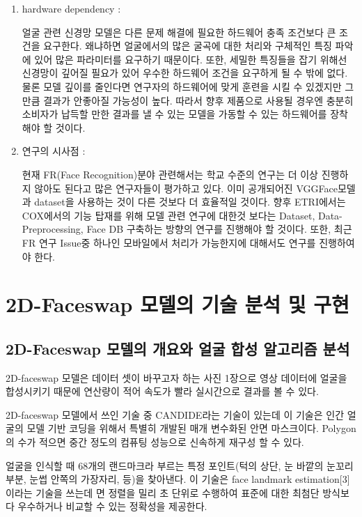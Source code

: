 \documentclass[chapter,oneside]{oblivoir}
\begin{document}
\begin{enumerate}
    \item hardware dependency : 

    얼굴 관련 신경망 모델은 다른 문제 해결에 필요한 하드웨어 충족 조건보다 큰 조건을 요구한다. 왜냐하면 얼굴에서의 많은 굴곡에 대한 처리와 구체적인 특징 파악에 있어 많은 파라미터를 요구하기 때문이다. 또한, 세밀한 특징들을 잡기 위해선 신경망이 깊어질 필요가 있어 우수한 하드웨어 조건을 요구하게 될 수 밖에 없다. 물론 모델 깊이를 줄인다면 연구자의 하드웨어에 맞게 훈련을 시킬 수 있겠지만 그만큼 결과가 안좋아질 가능성이 높다. 따라서 향후 제품으로 사용될 경우엔 충분히 소비자가 납득할 만한 결과를 낼 수 있는 모델을 가동할 수 있는 하드웨어를 장착해야 할 것이다. 

    \item 연구의 시사점 : 

    현재 FR(Face Recognition)분야 관련해서는 학교 수준의 연구는 더 이상 진행하지 않아도 된다고 많은 연구자들이 평가하고 있다. 이미 공개되어진 VGGFace모델과 dataset을 사용하는 것이 다른 것보다 더 효율적일 것이다. 향후 ETRI에서는 COX에서의 기능 탑재를 위해 모델 관련 연구에 대한것 보다는 Dataset, Data-Preprocessing, Face DB 구축하는 방향의 연구를 진행해야 할 것이다. 또한, 최근 FR 연구 Issue중 하나인 모바일에서 처리가 가능한지에 대해서도 연구를 진행하여야 한다.
        
\end{enumerate}

\chapter{ 2D-Faceswap 모델의 기술 분석 및 구현 }

\section{2D-Faceswap 모델의 개요와 얼굴 합성 알고리즘 분석}

2D-faceswap 모델은 데이터 셋이 바꾸고자 하는 사진 1장으로 영상 데이터에 얼굴을 합성시키기 때문에 연산량이 적어 속도가 빨라 실시간으로 결과를 볼 수 있다. 

2D-faceswap 모델에서 쓰인 기술 중 CANDIDE라는 기술이 있는데 이 기술은 인간 얼굴의 모델 기반 코딩을 위해서 특별히 개발된 매개 변수화된 안면 마스크이다. Polygon의 수가 적으면 중간 정도의 컴퓨팅 성능으로 신속하게 재구성 할 수 있다.

얼굴을 인식할 때 68개의 랜드마크라 부르는 특정 포인트(턱의 상단, 눈 바깥의 눈꼬리부분, 눈썹 안쪽의 가장자리, 등)을 찾아낸다. 이 기술은 face landmark estimation[3]이라는 기술을 쓰는데 면 정렬을 밀리 초 단위로 수행하여 표준에 대한 최첨단 방식보다 우수하거나 비교할 수 있는 정확성을 제공한다. 
\end{document}
